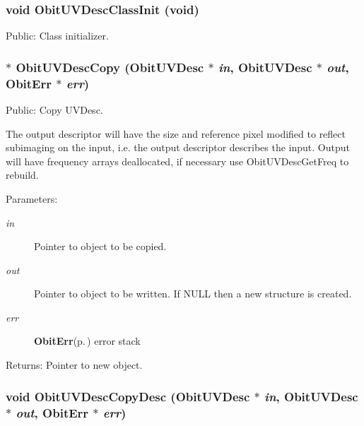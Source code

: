 \subsubsection{\setlength{\rightskip}{0pt plus 5cm}void Obit\-UVDesc\-Class\-Init (void)}\label{ObitUVDesc_8h_a7}


Public: Class initializer. 

\subsubsection{$\ast$ Obit\-UVDesc\-Copy ({\bf Obit\-UVDesc} $\ast$ {\em in}, {\bf Obit\-UVDesc} $\ast$ {\em out}, {\bf Obit\-Err} $\ast$ {\em err})}\label{ObitUVDesc_8h_a9}


Public: Copy UVDesc. 

The output descriptor will have the size and reference pixel modified to reflect subimaging on the input, i.e. the output descriptor describes the input. Output will have frequency arrays deallocated, if necessary use Obit\-UVDesc\-Get\-Freq to rebuild. \begin{Desc}
\item[Parameters:]
\begin{description}
\item[{\em in}]Pointer to object to be copied. \item[{\em out}]Pointer to object to be written. If NULL then a new structure is created. \item[{\em err}]{\bf Obit\-Err}{\rm (p.\,\pageref{structObitErr})} error stack \end{description}
\end{Desc}
\begin{Desc}
\item[Returns:]Pointer to new object. \end{Desc}
\subsubsection{\setlength{\rightskip}{0pt plus 5cm}void Obit\-UVDesc\-Copy\-Desc ({\bf Obit\-UVDesc} $\ast$ {\em in}, {\bf Obit\-UVDesc} $\ast$ {\em out}, {\bf Obit\-Err} $\ast$ {\em err})}\label{ObitUVDesc_8h_a11}


